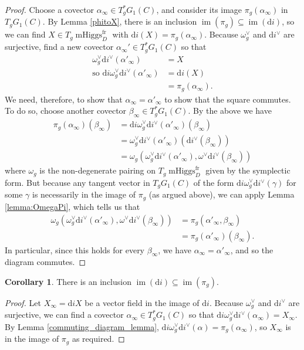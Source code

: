 \documentclass[11pt, oneside, reqno]{amsart}
\theoremstyle{definition} \newtheorem{definition}{Definition}[section]
\newtheorem{corollary}[definition]{Corollary}
\theoremstyle{definition} \newtheorem{remark}[definition]{Remark}
\theoremstyle{definition} \newtheorem{remarks}[definition]{Remarks}
\theoremstyle{definition} \newtheorem{question}[definition]{Question}
\theoremstyle{definition} \newtheorem*{note}{Note}
\theoremstyle{definition} \newtheorem{example}[definition]{Example}
\theoremstyle{definition} \newtheorem{examples}[definition]{Examples}
\newcommand{\sub}{\subseteq}
\DeclareMathOperator{\mhiggs}{mHiggs}
\DeclareMathOperator{\im}{im}
\renewcommand{\d}{\mathrm{d}}
\newcommand{\fr}{\mathrm{fr}}
\begin{document}
\begin{proof}
Choose a covector $\alpha_\infty \in T^*_g {G_1(C)}$, and consider its image $\pi_g(\alpha_\infty)$ in $T_g G_1(C)$.  By Lemma \ref{phitoX}, there is an inclusion $\im(\pi_g) \sub \im(\d i)$, so we can find $X \in T_g \mhiggs^\fr_D$ with $\d i(X) = \pi_g(\alpha_\infty)$.  Because $\omega^\vee_g$ and $\d i^\vee$ are surjective, find a new covector $\alpha_\infty' \in T^*_g {G_1(C)}$ so that
\begin{align*}
\omega^\vee_g \d i^\vee(\alpha'_\infty) &= X \\
\text{so } \d i \omega^\vee_g \d i^\vee(\alpha'_\infty) &= \d i(X) \\
&= \pi_g(\alpha_\infty).
\end{align*}
We need, therefore, to show that $\alpha_\infty = \alpha'_\infty$ to show that the square commutes.  To do so, choose another covector $\beta_\infty \in T^*_g G_1(C)$.  By the above we have
\begin{align*}
\pi_g(\alpha_\infty)(\beta_\infty) &= \d i \omega^\vee_g \d i^\vee(\alpha'_\infty)(\beta_\infty) \\
&= \omega^\vee_g \d i^\vee(\alpha'_\infty)(\d i^\vee(\beta_\infty))\\
&= \omega_g(\omega^\vee_g \d i^\vee(\alpha'_\infty), \omega^\vee\d i^\vee(\beta_\infty))
\end{align*}
where $\omega_g$ is the non-degenerate pairing on $T_g \mhiggs^\fr_D$ given by the symplectic form.  But because any tangent vector in $T_g G_1(C)$ of the form $\d i \omega^\vee_g \d i^\vee(\gamma)$ for some $\gamma$ is necessarily in the image of $\pi_g$ (as argued above), we can apply Lemma \ref{lemma:OmegaPi}, which tells us that 
\begin{align*} 
\omega_g(\omega^\vee_g \d i^\vee(\alpha'_\infty), \omega^\vee\d i^\vee(\beta_\infty)) &= \pi_g(\alpha'_\infty, \beta_\infty)\\
&= \pi_g(\alpha'_\infty)(\beta_\infty).
\end{align*}
In particular, since this holds for every $\beta_\infty$, we have $\alpha_\infty = \alpha'_\infty$, and so the diagram commutes.
\end{proof}

\begin{corollary}
There is an inclusion $\im(\d i) \sub \im(\pi_g)$. 
\end{corollary}

\begin{proof}
Let $X_\infty = \d i X$ be a vector field in the image of $\d i$.  Because $\omega^\vee_g$ and $\d i^\vee$ are surjective, we can find a covector $\alpha_\infty \in T^*_g {G_1(C)}$ so that $\d i \omega^\vee_g \d i^\vee(\alpha_\infty) = X_\infty$.  By Lemma \ref{commuting_diagram_lemma}, $\d i \omega^\vee_g \d i^\vee(\alpha) = \pi_g(\alpha_\infty)$, so $X_\infty$ is in the image of $\pi_g$ as required.
\end{proof}
\end{document}

